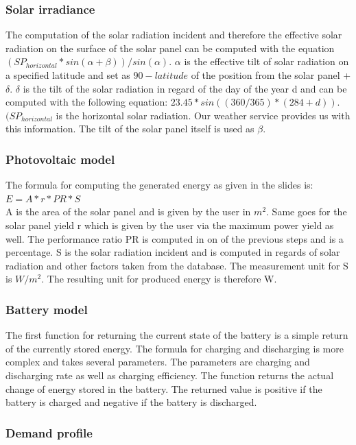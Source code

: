\subsubsection{Solar irradiance}
The computation of the solar radiation incident and therefore the effective solar radiation on the surface of the solar panel can be computed with the equation $(SP_{horizontal} * sin(\alpha + \beta))/sin(\alpha)$.
$\alpha$ is the effective tilt of solar radiation on a specified latitude and set as $90 - latitude$ of the position from the solar panel + $\delta$.
$\delta$ is the tilt of the solar radiation in regard of the day of the year d and can be computed with the following equation: $23.45 * sin((360/365) * (284 + d))$. $(SP_{horizontal}$ is the horizontal solar radiation. Our weather service provides us with this information.
The tilt of the solar panel  itself is used as $\beta$. \cite{SolarRadiation}
\subsubsection{Photovoltaic model}
The formula for computing the generated energy as given in the slides is: $E = A * r * PR * S$\\
A is the area of the solar panel and is given by the user in $m^{2}$.
Same goes for the solar panel yield r which is given by the user via the maximum power yield as well.
The performance ratio PR  is computed in on of the previous steps and is  a percentage.
S is the solar radiation incident and is computed in regards of solar radiation and other factors taken from the database.
The measurement unit for S is $W/m^{2}$.
The resulting unit for produced energy is therefore W.
\subsubsection{Battery model}
The first function for returning the current state of the battery is a simple return of the currently stored energy.
The formula for charging and discharging is more complex and takes several parameters.
The parameters are charging and discharging rate as well as charging efficiency.
The function returns the actual change of energy stored in the battery.
The returned value is positive if the battery is charged and negative if the battery is discharged.
\subsubsection{Demand profile}\label{subsec:Demand}

